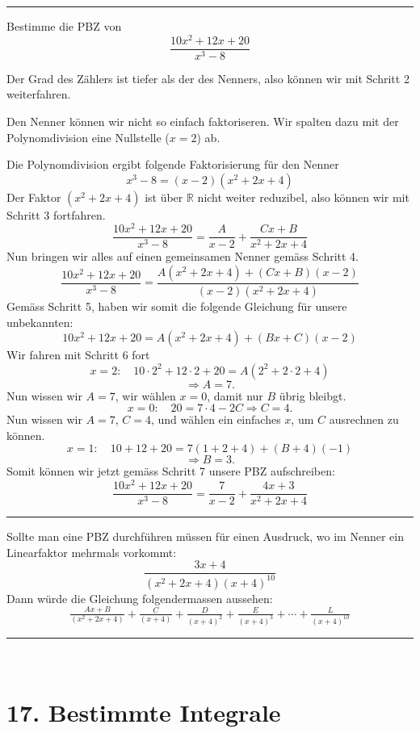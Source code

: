 \documentclass[a4paper,landscape,8pt]{extarticle}
\newcommand{\R}{\mathbb{R}}
\newcommand{\sep}{\vspace{5pt}\noindent\hrule\vspace{5pt}}
\renewcommand*{\newpage}{ \ }
\begin{document}
\begin{multicols*}{4}
\begin{warmup}
\sep

\Bsp Bestimme die PBZ von
\[
\frac{10x^2+12x+20}{x^3-8}
\]

Der Grad des Zählers ist tiefer als der des Nenners, also können wir mit Schritt
2 weiterfahren.

Den Nenner können wir nicht so einfach faktoriseren. Wir spalten dazu mit der
Polynomdivision eine Nullstelle ($x=2$) ab.

Die Polynomdivision ergibt folgende Faktorisierung für den Nenner
\[
x^3-8 = (x-2)(x^2+2x+4)
\]
Der Faktor $(x^2+2x+4)$ ist über $\R$ nicht weiter reduzibel, also können wir
mit Schritt 3 fortfahren.
\[
\frac{10x^2+12x+20}{x^3-8} = \frac{A}{x-2} + \frac{Cx+B}{x^2+2x+4}
\]
Nun bringen wir alles auf einen gemeinsamen Nenner gemäss Schritt 4.
\[
\frac{10x^2+12x+20}{x^3-8} = \frac{A(x^2+2x+4)+(Cx+B)(x-2)}{(x-2)(x^2+2x+4)}
\]
Gemäss Schritt 5, haben wir somit die folgende Gleichung für unsere
unbekannten:
\[
10x^2+12x+20 = A(x^2+2x+4)+(Bx+C)(x-2)
\]
Wir fahren mit Schritt 6 fort
\[
x=2: \quad 10\cdot 2^2+12\cdot 2+20 = A(2^2+2\cdot 2+4)
\]
\[
\Longrightarrow A = 7.
\]
Nun wissen wir $A=7$, wir wählen $x=0$, damit nur $B$ übrig bleibgt.
\[
x=0:  \quad 20 = 7\cdot 4 -2C \Longrightarrow C=4.
\]
Nun wissen wir $A=7$, $C=4$, und wählen ein einfaches $x$, um $C$ ausrechnen zu
können.
\[
x=1: \quad 10+12+20 = 7(1+2+4)+(B+4)(-1)
\]
\[
\Longrightarrow B = 3.
\]
Somit können wir jetzt gemäss Schritt 7 unsere PBZ aufschreiben:
\[
\frac{10x^2+12x+20}{x^3-8} = \frac{7}{x-2} + \frac{4x+3}{x^2+2x+4}
\]

\sep

\Bsp Sollte man eine PBZ durchführen müssen für einen Ausdruck, wo im Nenner ein
Linearfaktor mehrmals vorkommt:
\[
\frac{3x + 4}{(x^2+2x+4)(x+4)^{10}}
\]
Dann würde die Gleichung folgendermassen aussehen:
\[
\tfrac{Ax+B}{(x^2+2x+4)} + \tfrac{C}{(x+4)} + \tfrac{D}{(x+4)^2} +
\tfrac{E}{(x+4)^3} + \cdots + \tfrac{L}{(x+4)^{10}}
\]

\sep
\end{warmup}
















\newpage

\section{17. Bestimmte Integrale}


\end{multicols*}
\end{document}
